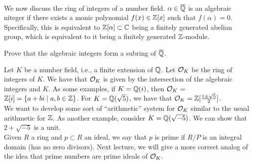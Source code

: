 \\[8pt]
We now discuss the ring of integers of a number field. $\alpha \in \overline {\mathbb Q}$ is an algebraic niteger if there exists a monic polynomial $f(x) \in \mathbb Z[x]$ such that $f(\alpha) = 0$. Specifically, this is equivalent to $\mathbb Z[\alpha] \subset \mathbb C$ being a finitely generated abelian group, which is equivalent to it being a finitely generated $\mathbb Z$-module. 
\begin{exercise}
    Prove that the algebraic integers form a subring of $\overline {\mathbb Q}$.
\end{exercise}
\noindent Let $K$ be a number field, i.e., a finite extension of $\mathbb Q$. Let $\mathcal O_K$ be the ring of integers of $K$. We have that $\mathcal O_K$ is given by the intersection of the algebraic integers and $K$. As some examples, if $K = \mathbb Q(i)$, then $\mathcal O_K$ = $\mathbb Z[i] = \{a + bi \mid a, b \in \mathbb Z\}$. For $K = \mathbb Q(\sqrt{5})$, we have that $\mathcal O_K = \mathbb Z[\frac{1 \pm \sqrt{5}}{2}]$.
\\[8pt]
We want to develop some sort of ``arithmetic'' system for $\mathcal O_K$ similar to the usual arithmetic for $\mathbb Z$. As another example, consider $K = \mathbb Q(\sqrt{-5})$. We can show that $2 + \sqrt{-5}$ is a unit.
\\[8pt]
Given $R$ a ring and $p \subset R$ an ideal, we say that $p$ is prime if $R/P$ is an integral domain (has no zero divisors). Next lecture, we will give a more correct analog of the idea that prime numbers are prime ideals of $\mathcal O_K$.